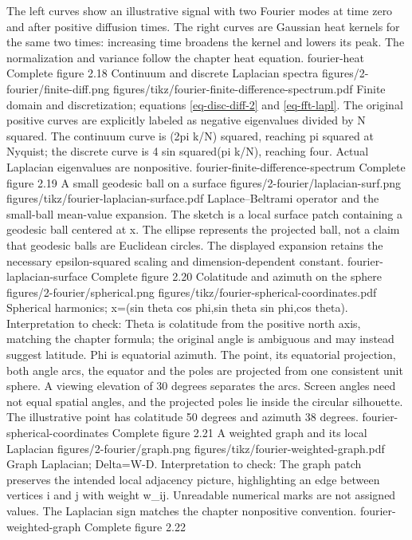 {The left curves show an illustrative signal with two Fourier modes at time zero and after positive diffusion times. The right curves are Gaussian heat kernels for the same two times: increasing time broadens the kernel and lowers its peak. The normalization and variance follow the chapter heat equation.}
{fourier-heat}
{Complete figure}
{2.18}
{Continuum and discrete Laplacian spectra}
{figures/2-fourier/finite-diff.png}
{figures/tikz/fourier-finite-difference-spectrum.pdf}
{Finite domain and discretization; equations \eqref{eq-disc-diff-2} and \eqref{eq-fft-lapl}.}
{The original positive curves are explicitly labeled as negative eigenvalues divided by N squared. The continuum curve is (2pi k/N) squared, reaching pi squared at Nyquist; the discrete curve is 4 sin squared(pi k/N), reaching four. Actual Laplacian eigenvalues are nonpositive.}
{fourier-finite-difference-spectrum}
{Complete figure}
{2.19}
{A small geodesic ball on a surface}
{figures/2-fourier/laplacian-surf.png}
{figures/tikz/fourier-laplacian-surface.pdf}
{Laplace--Beltrami operator and the small-ball mean-value expansion.}
{The sketch is a local surface patch containing a geodesic ball centered at x. The ellipse represents the projected ball, not a claim that geodesic balls are Euclidean circles. The displayed expansion retains the necessary epsilon-squared scaling and dimension-dependent constant.}
{fourier-laplacian-surface}
{Complete figure}
{2.20}
{Colatitude and azimuth on the sphere}
{figures/2-fourier/spherical.png}
{figures/tikz/fourier-spherical-coordinates.pdf}
{Spherical harmonics; x=(sin theta cos phi,sin theta sin phi,cos theta).}
{Interpretation to check: Theta is colatitude from the positive north axis, matching the chapter formula; the original angle is ambiguous and may instead suggest latitude. Phi is equatorial azimuth. The point, its equatorial projection, both angle arcs, the equator and the poles are projected from one consistent unit sphere. A viewing elevation of 30 degrees separates the arcs. Screen angles need not equal spatial angles, and the projected poles lie inside the circular silhouette. The illustrative point has colatitude 50 degrees and azimuth 38 degrees.}
{fourier-spherical-coordinates}
{Complete figure}
{2.21}
{A weighted graph and its local Laplacian}
{figures/2-fourier/graph.png}
{figures/tikz/fourier-weighted-graph.pdf}
{Graph Laplacian; Delta=W-D.}
{Interpretation to check: The graph patch preserves the intended local adjacency picture, highlighting an edge between vertices i and j with weight w\_ij. Unreadable numerical marks are not assigned values. The Laplacian sign matches the chapter nonpositive convention.}
{fourier-weighted-graph}
{Complete figure}
{2.22}
